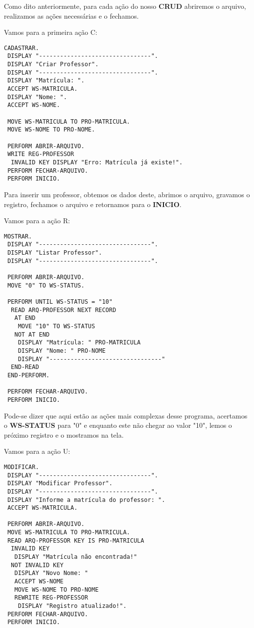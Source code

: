 Como dito anteriormente, para cada ação do nosso \textbf{CRUD} abriremos o arquivo, realizamos as ações necessárias e o fechamos.

Vamos para a primeira ação C:
\begin{lstlisting}[]
CADASTRAR.
 DISPLAY "--------------------------------".
 DISPLAY "Criar Professor".
 DISPLAY "--------------------------------".
 DISPLAY "Matrícula: ".
 ACCEPT WS-MATRICULA.
 DISPLAY "Nome: ".
 ACCEPT WS-NOME.

 MOVE WS-MATRICULA TO PRO-MATRICULA.
 MOVE WS-NOME TO PRO-NOME.

 PERFORM ABRIR-ARQUIVO.
 WRITE REG-PROFESSOR
  INVALID KEY DISPLAY "Erro: Matrícula já existe!".
 PERFORM FECHAR-ARQUIVO.
 PERFORM INICIO.	
\end{lstlisting}

Para inserir um professor, obtemos os dados deste, abrimos o arquivo, gravamos o registro, fechamos o arquivo e retornamos para o \textbf{INICIO}.

Vamos para a ação R:
\begin{lstlisting}[]
MOSTRAR.
 DISPLAY "--------------------------------".
 DISPLAY "Listar Professor".
 DISPLAY "--------------------------------".

 PERFORM ABRIR-ARQUIVO.
 MOVE "0" TO WS-STATUS.

 PERFORM UNTIL WS-STATUS = "10"
  READ ARQ-PROFESSOR NEXT RECORD
   AT END 
    MOVE "10" TO WS-STATUS
   NOT AT END
    DISPLAY "Matrícula: " PRO-MATRICULA
    DISPLAY "Nome: " PRO-NOME
    DISPLAY "--------------------------------"
  END-READ
 END-PERFORM.

 PERFORM FECHAR-ARQUIVO.
 PERFORM INICIO.	
\end{lstlisting}

Pode-se dizer que aqui estão as ações mais complexas desse programa, acertamos o \textbf{WS-STATUS} para "0" e enquanto este não chegar ao valor "10", lemos o próximo registro e o mostramos na tela.

Vamos para a ação U:
\begin{lstlisting}[]
MODIFICAR.
 DISPLAY "--------------------------------".
 DISPLAY "Modificar Professor".
 DISPLAY "--------------------------------".
 DISPLAY "Informe a matrícula do professor: ".
 ACCEPT WS-MATRICULA.

 PERFORM ABRIR-ARQUIVO.
 MOVE WS-MATRICULA TO PRO-MATRICULA.
 READ ARQ-PROFESSOR KEY IS PRO-MATRICULA
  INVALID KEY 
   DISPLAY "Matrícula não encontrada!"
  NOT INVALID KEY
   DISPLAY "Novo Nome: "
   ACCEPT WS-NOME
   MOVE WS-NOME TO PRO-NOME
   REWRITE REG-PROFESSOR
    DISPLAY "Registro atualizado!".
 PERFORM FECHAR-ARQUIVO.
 PERFORM INICIO.	
\end{lstlisting}

